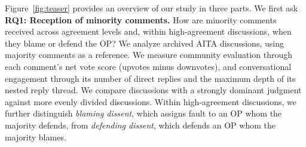 



Figure~\ref{fig:teaser} provides an overview of our study in three
parts. We first ask \textbf{RQ1: Reception of minority comments.}
How are minority comments received across agreement levels and,
within high-agreement discussions, when they blame or defend the
OP? We analyze archived AITA discussions, using majority comments
as a reference. We measure community evaluation through each
comment's net vote score (upvotes minus downvotes), and conversational
engagement through its number of direct replies and the maximum
depth of its nested reply thread. We compare discussions with a
strongly dominant judgment against more evenly divided discussions.
Within high-agreement discussions, we further distinguish
\emph{blaming dissent}, which assigns fault to an OP whom the
majority defends, from \emph{defending dissent}, which defends an
OP whom the majority blames.

